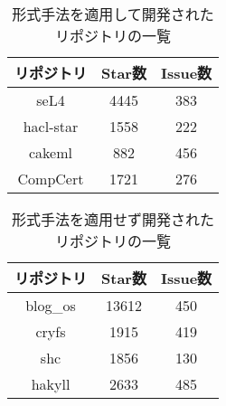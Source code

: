 \begin{table}[p]
	\centering
	\caption{形式手法を適用して開発されたリポジトリの一覧}
	\label{tab:repository_formal}
	\begin{tabular}{ccc} %
		\hline
		リポジトリ & Star数 & Issue数 \\\hline
		seL4       & 4445   & 383     \\
		hacl-star  & 1558   & 222     \\
		cakeml     & 882    & 456     \\
		CompCert   & 1721   & 276     \\\hline
	\end{tabular}
\end{table}

\begin{table}[p]
	\centering
	\caption{形式手法を適用せず開発されたリポジトリの一覧}
	\label{tab:repository_common}
	\begin{tabular}{ccc} %
		\hline
		リポジトリ & Star数 & Issue数 \\\hline
		blog\_os   & 13612  & 450     \\
		cryfs      & 1915   & 419     \\
		shc        & 1856   & 130     \\
		hakyll     & 2633   & 485     \\\hline
	\end{tabular}
\end{table}



